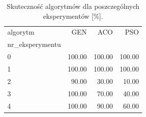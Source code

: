 \begin{table}
\caption{Skuteczność algorytmów dla poszczególnych eksperymentów [\%].}
\label{tab:success_rate}
\begin{tabular}{lrrr}
\toprule
algorytm & GEN & ACO & PSO \\
nr_eksperymentu &  &  &  \\
\midrule
0 & 100.00 & 100.00 & 100.00 \\
1 & 100.00 & 100.00 & 100.00 \\
2 & 90.00 & 30.00 & 10.00 \\
3 & 100.00 & 70.00 & 40.00 \\
4 & 100.00 & 90.00 & 60.00 \\
\bottomrule
\end{tabular}
\end{table}
